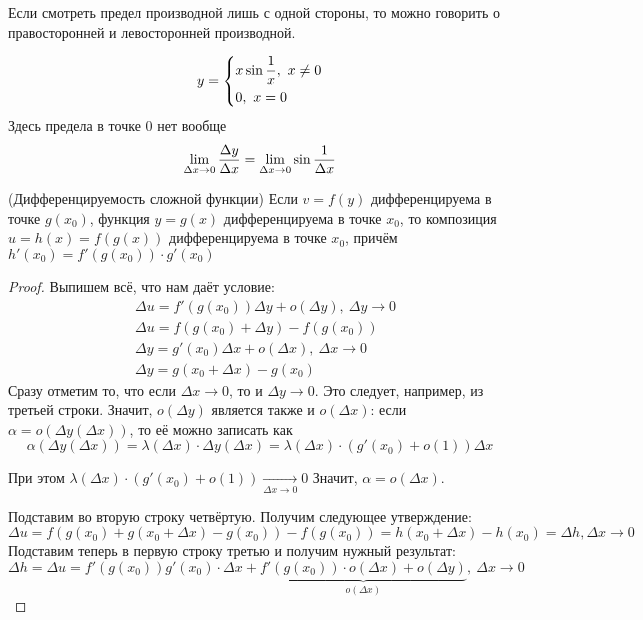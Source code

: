 \begin{note}
	Если смотреть предел производной лишь с одной стороны, то можно говорить о правосторонней и левосторонней производной.
\end{note}

\begin{example}
	\[
	y = \left\{\begin{aligned}&{x \sin \frac{1}{x},\ x \neq 0} \\ &{0,\ x = 0}\end{aligned}\right.
	\]
	Здесь предела в точке 0 нет вообще
	\[
	\lim\limits_{\Delta x \to 0} \frac{\Delta y}{\Delta x} = \lim\limits_{\Delta x \to 0} \sin \frac{1}{\Delta x}
	\]
\end{example}

\begin{theorem} (Дифференцируемость сложной функции)
	Если $v = f(y)$ дифференцируема в точке $g(x_0)$, функция $y = g(x)$ дифференцируема в точке $x_0$, то композиция $u = h(x) = f(g(x))$ дифференцируема в точке $x_0$, причём $h'(x_0) = f'(g(x_0)) \cdot g'(x_0)$
\end{theorem}

\begin{proof}
	Выпишем всё, что нам даёт условие:
	\begin{align*}
		&{\Delta u = f'(g(x_0))\Delta y + o(\Delta y),\ \Delta y \to 0}
		\\
		&{\Delta u = f(g(x_0) + \Delta y) - f(g(x_0))}
		\\
		&{\Delta y = g'(x_0)\Delta x + o(\Delta x),\ \Delta x \to 0}
		\\
		&{\Delta y = g(x_0 + \Delta x) - g(x_0)}
	\end{align*}
	Сразу отметим то, что если $\Delta x \to 0$, то и $\Delta y \to 0$. Это следует, например, из третьей строки. Значит, $o(\Delta y)$ является также и $o(\Delta x)$: если $\alpha = o(\Delta y(\Delta x))$, то её можно записать как
	\[
	\alpha(\Delta y(\Delta x)) = \lambda(\Delta x) \cdot \Delta y(\Delta x) = \lambda(\Delta x) \cdot (g'(x_0) + o(1))\Delta x
	\]
	
	При этом $\lambda(\Delta x) \cdot (g'(x_0) + o(1)) \xrightarrow[\Delta x \to 0]{} 0$ Значит, $\alpha = o(\Delta x)$.
	
	Подставим во вторую строку четвёртую. Получим следующее утверждение:
	\[
	\Delta u = f(g(x_0) + g(x_0 + \Delta x) - g(x_0)) - f(g(x_0)) = h(x_0 + \Delta x) - h(x_0) = \Delta h, \Delta x \to 0
	\]
	Подставим теперь в первую строку третью и получим нужный результат:
	\[
	\Delta h = \Delta u = f'(g(x_0))g'(x_0) \cdot \Delta x + \underbrace{f'(g(x_0)) \cdot o(\Delta x) + o(\Delta y)}_{o(\Delta x)},\ \Delta x \to 0
	\]
\end{proof}

